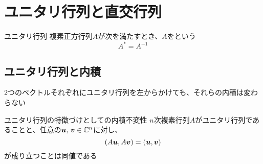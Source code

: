 \documentclass[../../../topic_linear-algebra]{subfiles}
\begin{document}
\sectionline
\section{ユニタリ行列と直交行列}

\begin{definition}{ユニタリ行列}
  複素正方行列$A$が次を満たすとき、$A$をという
  \begin{equation*}
    A^* = A^{-1}
  \end{equation*}
\end{definition}

\subsection{ユニタリ行列と内積}

2つのベクトルそれぞれにユニタリ行列を左からかけても、それらの内積は変わらない

\begin{theorem}{ユニタリ行列の特徴づけとしての内積不変性}\label{thm:unitary-characterized-by-inner-product-invariance}
  $n$次複素行列$A$がユニタリ行列であることと、任意の$\vb*{u},\,\vb*{v} \in \mathbb{C}^n$に対し、
  \begin{equation*}
    (A\vb*{u}, A\vb*{v}) = (\vb*{u}, \vb*{v})
  \end{equation*}
  が成り立つことは同値である
\end{theorem}
\end{document}
